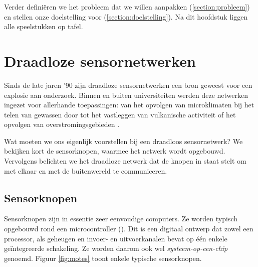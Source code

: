 Verder defini\"eren we het probleem dat we willen aanpakken
(\ref{section:probleem}) en stellen onze doelstelling voor
(\ref{section:doelstelling}). Na dit hoofdstuk liggen alle speelstukken op
tafel.

\section{Draadloze sensornetwerken}
\label{section:wsn}

Sinds de late jaren '90 zijn draadloze sensornetwerken een bron geweest voor
een explosie aan onderzoek. Binnen en buiten universiteiten werden deze
netwerken ingezet voor allerhande toepassingen: van het opvolgen van
microklimaten bij het telen van gewassen door \cite{baggio2005wireless} tot het
vastleggen van vulkanische activiteit \cite{werner2005monitoring} of het
opvolgen van overstromingsgebieden \cite{hughes2006gridstix}.

Wat moeten we ons eigenlijk voorstellen bij een draadloos sensornetwerk? We
bekijken kort de sensorknopen, waarmee het netwerk wordt opgebouwd. Vervolgens
belichten we het draadloze netwerk dat de knopen in staat stelt om met elkaar
en met de buitenwereld te communiceren.

\subsection{Sensorknopen}

Sensorknopen zijn in essentie zeer eenvoudige computers. Ze worden typisch
opgebouwd rond een microcontroller (\mcu). Dit is een digitaal ontwerp dat
zowel een processor, als geheugen en invoer- en uitvoerkanalen bevat op \'e\'en
enkele ge\"integreerde schakeling. Ze worden daarom ook wel
\emph{systeem-op-een-chip} genoemd. Figuur \ref{fig:motes} toont enkele
typische sensorknopen.

